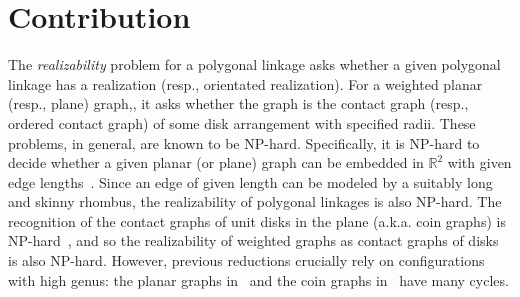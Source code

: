 \documentclass[10pt]{CSUNthesis}
\theoremstyle{plain}%
\newtheorem{pf}{Proof}
\theoremstyle{definition}
\theoremstyle{remark}
\newcommand{\RR}{\mathbb{R}} %
\begin{document}
%

\section{Contribution}
The \emph{realizability} problem for a polygonal linkage asks whether a given polygonal linkage has 
a realization (resp., orientated realization). For a weighted planar (resp., plane) graph,, it asks 
whether the graph is
the contact graph (resp., ordered contact graph) of some disk arrangement with specified radii. 
These problems, in general, are known to be NP-hard. Specifically, it is NP-hard to decide whether a 
given planar (or plane) graph can be embedded in $\RR^2$ with given edge lengths~\cite{CDD+10,EW90}. 
Since an edge of given length can be modeled by a suitably long and skinny rhombus, the 
realizability of polygonal linkages is also NP-hard. The recognition of the contact graphs of unit 
disks in the plane (a.k.a. coin graphs) is NP-hard~\cite{BK98}, and so the realizability of weighted 
graphs as contact graphs of disks is also NP-hard. However, previous reductions crucially rely on 
configurations with high genus: the planar graphs in~\cite{CDD+10,EW90} and the coin graphs 
in~\cite{BK98} have many cycles.
\end{document}
